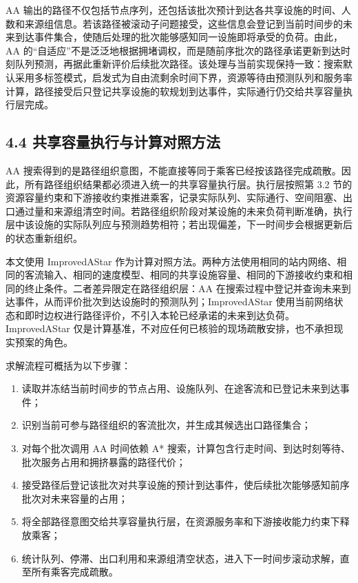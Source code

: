 \documentclass[UTF8,a4paper,12pt]{ctexart}
\begin{document}
AA 输出的路径不仅包括节点序列，还包括该批次预计到达各共享设施的时间、人数和来源组信息。若该路径被滚动子问题接受，这些信息会登记到当前时间步的未来到达事件集合，使随后处理的批次能够感知同一设施即将承受的负荷。由此，AA 的“自适应”不是泛泛地根据拥堵调权，而是随前序批次的路径承诺更新到达时刻队列预测，再据此重新评价后续批次路径。该处理与当前实现保持一致：搜索默认采用多标签模式，启发式为自由流剩余时间下界，资源等待由预测队列和服务率计算，路径接受后只登记共享设施的软规划到达事件，实际通行仍交给共享容量执行层完成。

\subsection{4.4 共享容量执行与计算对照方法}

AA 搜索得到的是路径组织意图，不能直接等同于乘客已经按该路径完成疏散。因此，所有路径组织结果都必须进入统一的共享容量执行层。执行层按照第 3.2 节的资源容量约束和下游接收约束推进乘客，记录实际队列、实际通行、空间阻塞、出口通过量和来源组清空时间。若路径组织阶段对某设施的未来负荷判断准确，执行层中该设施的实际队列应与预测趋势相符；若出现偏差，下一时间步会根据更新后的状态重新组织。

本文使用 ImprovedAStar 作为计算对照方法。两种方法使用相同的站内网络、相同的客流输入、相同的速度模型、相同的共享设施容量、相同的下游接收约束和相同的终止条件。二者差异限定在路径组织层：AA 在搜索过程中登记并查询未来到达事件，从而评价批次到达设施时的预测队列；ImprovedAStar 使用当前网络状态和即时边权进行路径评价，不引入本轮已经承诺的未来到达负荷。ImprovedAStar 仅是计算基准，不对应任何已核验的现场疏散安排，也不承担现实预案的角色。

求解流程可概括为以下步骤：
\begin{enumerate}
\item 读取并冻结当前时间步的节点占用、设施队列、在途客流和已登记未来到达事件；
\item 识别当前可参与路径组织的客流批次，并生成其候选出口路径集合；
\item 对每个批次调用 AA 时间依赖 A* 搜索，计算包含行走时间、到达时刻等待、批次服务占用和拥挤暴露的路径代价；
\item 接受路径后登记该批次对共享设施的预计到达事件，使后续批次能够感知前序批次对未来容量的占用；
\item 将全部路径意图交给共享容量执行层，在资源服务率和下游接收能力约束下释放乘客；
\item 统计队列、停滞、出口利用和来源组清空状态，进入下一时间步滚动求解，直至所有乘客完成疏散。
\end{enumerate}
\end{document}
